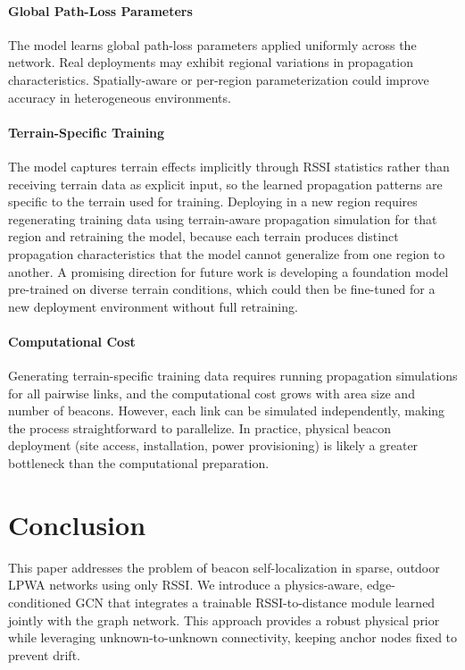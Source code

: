 \documentclass{ieeeaccess}
\begin{document}
\paragraph{Global Path-Loss Parameters}
The model learns global path-loss parameters applied uniformly across the network. Real deployments may exhibit regional variations in propagation characteristics. Spatially-aware or per-region parameterization could improve accuracy in heterogeneous environments.

\paragraph{Terrain-Specific Training}
The model captures terrain effects implicitly through RSSI statistics rather than receiving terrain data as explicit input, so the learned propagation patterns are specific to the terrain used for training. Deploying in a new region requires regenerating training data using terrain-aware propagation simulation for that region and retraining the model, because each terrain produces distinct propagation characteristics that the model cannot generalize from one region to another. A promising direction for future work is developing a foundation model pre-trained on diverse terrain conditions, which could then be fine-tuned for a new deployment environment without full retraining.

\paragraph{Computational Cost}
Generating terrain-specific training data requires running propagation simulations for all pairwise links, and the computational cost grows with area size and number of beacons. However, each link can be simulated independently, making the process straightforward to parallelize. In practice, physical beacon deployment (site access, installation, power provisioning) is likely a greater bottleneck than the computational preparation.

\section{Conclusion}
This paper addresses the problem of beacon self-localization in sparse, outdoor LPWA networks using only RSSI. We introduce a physics-aware, edge-conditioned GCN that integrates a trainable RSSI-to-distance module learned jointly with the graph network. This approach provides a robust physical prior while leveraging unknown-to-unknown connectivity, keeping anchor nodes fixed to prevent drift.
\end{document}
